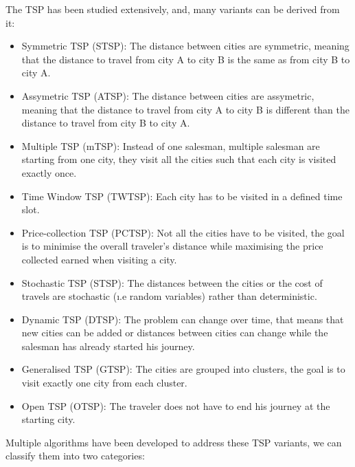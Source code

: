 The TSP has been studied extensively, and, many variants can be derived from it:

\begin{itemize}
    \item Symmetric TSP (STSP): The distance between cities are symmetric, meaning that the distance to travel from city A to city B is the same as from city B to city A. %
    \item Assymetric TSP (ATSP): The distance between cities are assymetric, meaning that the distance to travel from city A to city B is different than the distance to travel from city B to city A.\cite{ASTP}
    \item Multiple TSP (mTSP): Instead of one salesman, multiple salesman are starting from one city, they visit all the cities such that each city is visited exactly once. \cite{mTSP}
    \item Time Window TSP (TWTSP): Each city has to be visited in a defined time slot. \cite{TWTSP}
    \item Price-collection TSP (PCTSP): Not all the cities have to be visited, the goal is to minimise the overall traveler's distance while maximising the price collected earned when visiting a city. \cite{PCTSP}
    \item Stochastic TSP (STSP): The distances between the cities or the cost of travels are stochastic (\i.e random variables) rather than deterministic. \cite{Stochastic_TSP}
    \item Dynamic TSP (DTSP): The problem can change over time, that means that new cities can be added or distances between cities can change while the salesman has already started his journey. \cite{DTSP}
    \item Generalised TSP (GTSP): The cities are grouped into clusters, the goal is to visit exactly one city from each cluster. \cite{GTSP}
    \item Open TSP (OTSP): The traveler does not have to end his journey at the starting city. \cite{OTSP}
\end{itemize}

Multiple algorithms have been developed to address these TSP variants, we can classify them into two categories:

